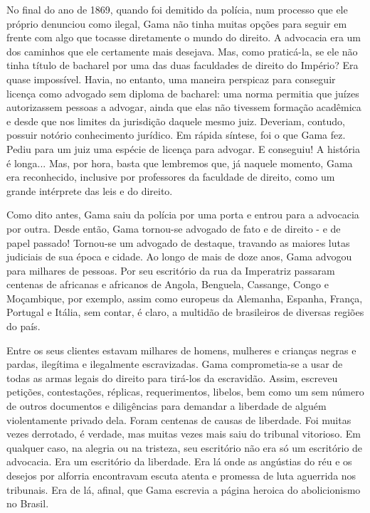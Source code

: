 No final do ano de 1869, quando foi demitido da polícia, num processo
que ele próprio denunciou como ilegal, Gama não tinha muitas opções para
seguir em frente com algo que tocasse diretamente o mundo do direito. A
advocacia era um dos caminhos que ele certamente mais desejava. Mas,
como praticá-la, se ele não tinha título de bacharel por uma das duas
faculdades de direito do Império? Era quase impossível. Havia, no
entanto, uma maneira perspicaz para conseguir licença como advogado sem
diploma de bacharel: uma norma permitia que juízes autorizassem pessoas
a advogar, ainda que elas não tivessem formação acadêmica e desde que
nos limites da jurisdição daquele mesmo juiz. Deveriam, contudo, possuir
notório conhecimento jurídico. Em rápida síntese, foi o que Gama fez.
Pediu para um juiz uma espécie de licença para advogar. E conseguiu! A
história é longa... Mas, por hora, basta que lembremos que, já naquele
momento, Gama era reconhecido, inclusive por professores da faculdade de
direito, como um grande intérprete das leis e do direito.

Como dito antes, Gama saiu da polícia por uma porta e entrou para a
advocacia por outra. Desde então, Gama tornou-se advogado de fato e de
direito - e de papel passado! Tornou-se um advogado de destaque,
travando as maiores lutas judiciais de sua época e cidade. Ao longo de
mais de doze anos, Gama advogou para milhares de pessoas. Por seu
escritório da rua da Imperatriz passaram centenas de africanas e
africanos de Angola, Benguela, Cassange, Congo e Moçambique, por
exemplo, assim como europeus da Alemanha, Espanha, França, Portugal e
Itália, sem contar, é claro, a multidão de brasileiros de diversas
regiões do país.

Entre os seus clientes estavam milhares de homens, mulheres e crianças
negras e pardas, ilegítima e ilegalmente escravizadas. Gama
comprometia-se a usar de todas as armas legais do direito para tirá-los
da escravidão. Assim, escreveu petições, contestações, réplicas,
requerimentos, libelos, bem como um sem número de outros documentos e
diligências para demandar a liberdade de alguém violentamente privado
dela. Foram centenas de causas de liberdade. Foi muitas vezes derrotado,
é verdade, mas muitas vezes mais saiu do tribunal vitorioso. Em qualquer
caso, na alegria ou na tristeza, seu escritório não era só um escritório
de advocacia. Era um escritório da liberdade. Era lá onde as angústias
do réu e os desejos por alforria encontravam escuta atenta e promessa de
luta aguerrida nos tribunais. Era de lá, afinal, que Gama escrevia a
página heroica do abolicionismo no Brasil.

